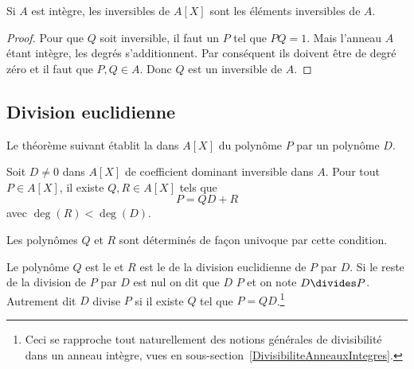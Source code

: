 \begin{corollary}
	Si \( A\) est intègre, les inversibles de \( A[X]\) sont les éléments inversibles de \( A\).
\end{corollary}

\begin{proof}
	Pour que \( Q\) soit inversible, il faut un \( P\) tel que \( PQ=1\). Mais l'anneau \( A\) étant intègre, les degrés s'additionnent. Par conséquent ils doivent être de degré zéro et il faut que \( P,Q\in A\). Donc \( Q\) est un inversible de \( A\).
\end{proof}

\subsection{Division euclidienne}

Le théorème suivant établit la  dans \( A[X]\) du polynôme \( P\) par un polynôme \( D\).
\begin{theorem}     \label{ThodivEuclPsFexf}
	Soit \( D\neq 0\) dans \( A[X]\) de coefficient dominant inversible dans \( A\). Pour tout \( P\in A[X]\), il existe \( Q,R\in A[X]\) tels que
	\begin{equation}
		P=QD+R
	\end{equation}
	avec \( \deg(R)<\deg(D)\).

	Les polynômes \( Q\) et \( R\) sont déterminés de façon univoque par cette condition.
\end{theorem}

\begin{definition}\label{DefMPZooMmMymG}
	Le polynôme \( Q\) est le  et \( R\) est le  de la division euclidienne de \( P\) par \( D\). Si le reste de la division de \( P\) par \( D\) est nul on dit que \( D\)  \( P\) et on note \( D\divides P\). Autrement dit \( D\) divise \( P\) si il existe \( Q\) tel que \( P=QD\).\footnote{Ceci se rapproche tout naturellement des notions générales de divisibilité dans un anneau intègre, vues en sous-section~\ref{DivisibiliteAnneauxIntegres}.}
\end{definition}

